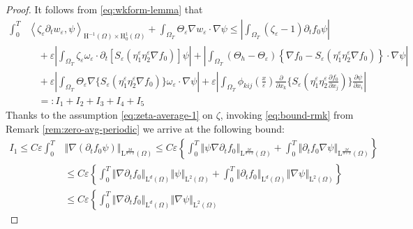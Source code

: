 \documentclass[preprint, 12pt]{amsart}
\numberwithin{equation}{section}
\numberwithin{equation}{section}
\newcommand{\eps}{\varepsilon}
\begin{document}
\begin{proof}
It follows from \eqref{eq:wkform-lemma} that
\begin{equation*}
\begin{aligned}
\int_0^T & \left\langle \zeta_\eps\partial_{t}w_{\varepsilon},\psi \right\rangle_{\mathrm{H}^{-1}(\Omega) \times \mathrm{H}_0^1(\Omega)} 
+ \int_{\Omega_T} \Theta_\eps\nabla w_{\varepsilon} \cdot \nabla \psi 
\le \left\vert \int_{\Omega_T} (\zeta_\eps -1)\partial_{t}f_{0}\psi \right\vert
\\
& \quad + \eps \left\vert \int_{\Omega_T} \zeta_\eps \omega_\eps \cdot \partial_t \left[S_\eps (\eta_1^\eps \eta_2^\eps \nabla f_0)\right] \psi \right\vert
+\left\vert \int_{\Omega_T}\left(\Theta_h - \Theta_\eps\right) \left\{\nabla f_0 - S_\eps(\eta_1^\eps\eta_2^\eps \nabla f_0)\right\} \cdot \nabla \psi\right\vert
\\
& \quad 
+ \eps \left\vert \int_{\Omega_T} \Theta_\eps \nabla \bigg\{S_{\varepsilon}(\eta_1^\eps \eta_2^\eps \nabla f_0)\bigg\}\omega_\eps \cdot \nabla \psi\right\vert
+ \eps \left\vert \int_{\Omega_T} \phi_{kij}\left(\frac{x}{\eps}\right) \frac{\partial}{\partial x_k} \bigg\{S_{\varepsilon}\left(\eta_1^\eps \eta_2^\eps \frac{\partial f_0}{\partial x_j} \right)\bigg\} \frac{\partial\psi}{\partial x_i} \right\vert
\\
& \quad =: I_1 + I_2 + I_3 + I_4 + I_5
\end{aligned}
\end{equation*}
Thanks to the assumption \eqref{eq:zeta-average-1} on $\zeta$, invoking \eqref{eq:bound-rmk} from Remark \ref{rem:zero-avg-periodic} we arrive at the following bound:
\begin{equation*}
\begin{aligned}
I_1 
\le C \eps \int_0^T & \left\Vert \nabla \left( \partial_t f_0 \psi \right) \right\Vert_{\mathrm L^{\frac{2d}{d+2}}(\Omega)}
\le C \eps \left\{ \int_0^T \left\Vert \psi \nabla\partial_t f_0 \right\Vert_{\mathrm L^{\frac{2d}{d+2}}(\Omega)} 
+ \int_0^T \left\Vert \partial_t f_0 \nabla \psi \right\Vert_{\mathrm L^{\frac{2d}{d+2}}(\Omega)}\right\}
\\
& \le C \eps \left\{ \int_0^T \left\Vert \nabla\partial_t f_0 \right\Vert_{\mathrm L^d(\Omega)} \left\Vert \psi \right\Vert_{\mathrm L^2(\Omega)}  
+ \int_0^T \left\Vert \partial_t f_0 \right\Vert_{\mathrm L^d(\Omega)} \left\Vert \nabla \psi \right\Vert_{\mathrm L^2(\Omega)}\right\}
\\
& \le C \eps \left\{ \int_0^T \left\Vert \nabla\partial_t f_0 \right\Vert_{\mathrm L^d(\Omega)} \left\Vert \nabla \psi \right\Vert_{\mathrm L^2(\Omega)}  

\end{aligned}
\end{equation*}
\end{proof}
\end{document}
